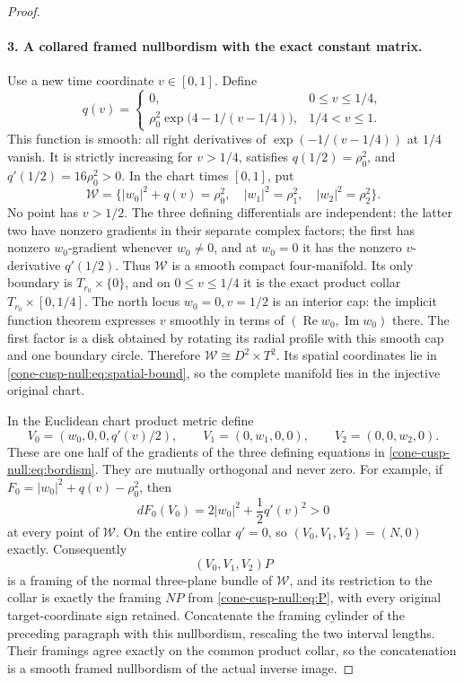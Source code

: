\documentclass[11pt,letterpaper]{article}
\numberwithin{equation}{section}
\theoremstyle{definition}
\theoremstyle{remark}
\begin{document}
\begin{proof}
\paragraph{3. A collared framed nullbordism with the exact constant matrix.}
Use a new time coordinate \(v\in[0,1]\). Define
\begin{equation}
 q(v)=
 \begin{cases}
 0,&0\leq v\leq1/4,\\
 \rho_0^2\exp\bigl(4-1/(v-1/4)\bigr),&1/4<v\leq1.
 \end{cases}
 \label{cone-cusp-null:eq:q}
\end{equation}
This function is smooth: all right derivatives of
\(\exp(-1/(v-1/4))\) at \(1/4\) vanish. It is strictly increasing
for \(v>1/4\), satisfies \(q(1/2)=\rho_0^2\), and
\(q'(1/2)=16\rho_0^2>0\).
In the chart times \([0,1]\), put
\begin{equation}
 \mathcal W=
 \{|w_0|^2+q(v)=\rho_0^2,\quad
       |w_1|^2=\rho_1^2,\quad|w_2|^2=\rho_2^2\}.
 \label{cone-cusp-null:eq:bordism}
\end{equation}
No point has \(v>1/2\). The three defining differentials are independent:
the latter two have nonzero gradients in their separate complex factors;
the first has nonzero \(w_0\)-gradient whenever \(w_0\ne0\), and at
\(w_0=0\) it has the nonzero \(v\)-derivative \(q'(1/2)\).
Thus \(\mathcal W\) is a smooth compact four-manifold. Its only
boundary is \(T_{r_0}\times\{0\}\), and on \(0\leq v\leq1/4\)
it is the exact product collar \(T_{r_0}\times[0,1/4]\).
The north locus \(w_0=0,v=1/2\) is an interior cap: the implicit
function theorem expresses \(v\) smoothly in terms of
\((\operatorname{Re}w_0,\operatorname{Im}w_0)\) there. The first
factor is a disk obtained by rotating its radial profile with this smooth
cap and one boundary circle. Therefore
\(\mathcal W\cong D^2\times T^2\).
Its spatial coordinates lie in \eqref{cone-cusp-null:eq:spatial-bound}, so the complete
manifold lies in the injective original chart.

In the Euclidean chart product metric define
\[
 V_0=(w_0,0,0,q'(v)/2),\qquad
 V_1=(0,w_1,0,0),\qquad V_2=(0,0,w_2,0).
\]
These are one half of the gradients of the three defining equations
in \eqref{cone-cusp-null:eq:bordism}. They are mutually orthogonal and never zero.
For example, if \(F_0=|w_0|^2+q(v)-\rho_0^2\), then
\[
 dF_0(V_0)=2|w_0|^2+\frac12q'(v)^2>0
\]
at every point of \(\mathcal W\). On the entire collar \(q'=0\), so
\((V_0,V_1,V_2)=(N,0)\) exactly. Consequently
\begin{equation}
 (V_0,V_1,V_2)P
 \label{cone-cusp-null:eq:extended-frame}
\end{equation}
is a framing of the normal three-plane bundle of \(\mathcal W\),
and its restriction to the collar is exactly the framing \(NP\) from
\eqref{cone-cusp-null:eq:P}, with every original target-coordinate sign retained.
Concatenate the framing cylinder of the preceding paragraph with this
nullbordism, rescaling the two interval lengths. Their framings agree
exactly on the common product collar, so the concatenation is a smooth
framed nullbordism of the actual inverse image.


\end{proof}
\end{document}
